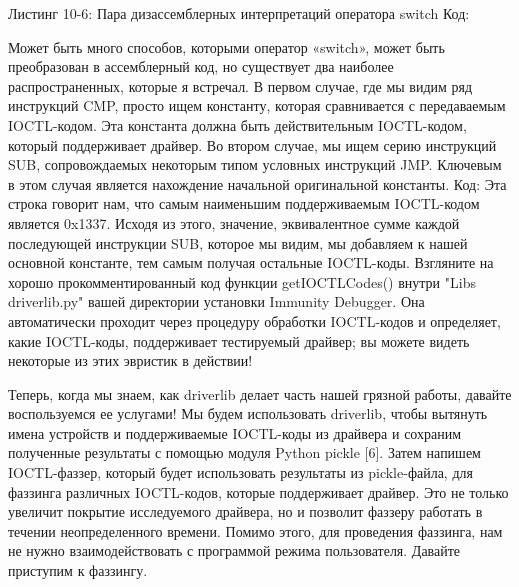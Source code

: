 \documentclass[12pt]{book}
\begin{document}
Листинг 10-6: Пара дизассемблерных интерпретаций оператора switch{}
Код:

Может быть много способов, которыми оператор «switch{}», может быть преобразован в ассемблерный код, но существует два наиболее распространенных, которые я встречал. В первом случае, где мы видим ряд инструкций CMP, просто ищем константу, которая сравнивается с передаваемым IOCTL-кодом. Эта константа должна быть действительным IOCTL-кодом, который поддерживает драйвер. Во втором случае, мы ищем серию инструкций SUB, сопровождаемых некоторым типом условных инструкций JMP. Ключевым в этом случая является нахождение начальной оригинальной константы. 
Код:
Эта строка говорит нам, что самым наименьшим поддерживаемым IOCTL-кодом является 0x1337. Исходя из этого, значение, эквивалентное сумме каждой последующей инструкции SUB, которое мы видим, мы добавляем к нашей основной константе, тем самым получая остальные IOCTL-коды. Взгляните на хорошо прокомментированный код функции getIOCTLCodes() внутри "Libs\\driverlib.py" вашей директории установки Immunity Debugger. Она автоматически проходит через процедуру обработки IOCTL-кодов и определяет, какие IOCTL-коды, поддерживает тестируемый драйвер; вы можете видеть некоторые из этих эвристик в действии! 

Теперь, когда мы знаем, как driverlib делает часть нашей грязной работы, давайте воспользуемся ее услугами! Мы будем использовать driverlib, чтобы вытянуть имена устройств и поддерживаемые IOCTL-коды из драйвера и сохраним полученные результаты с помощью модуля Python pickle [6]. Затем напишем IOCTL-фаззер, который будет использовать результаты из pickle-файла, для фаззинга различных IOCTL-кодов, которые поддерживает драйвер. Это не только увеличит покрытие исследуемого драйвера, но и позволит фаззеру работать в течении неопределенного времени. Помимо этого, для проведения фаззинга, нам не нужно взаимодействовать с программой режима пользователя. Давайте приступим к фаззингу.
\end{document}
